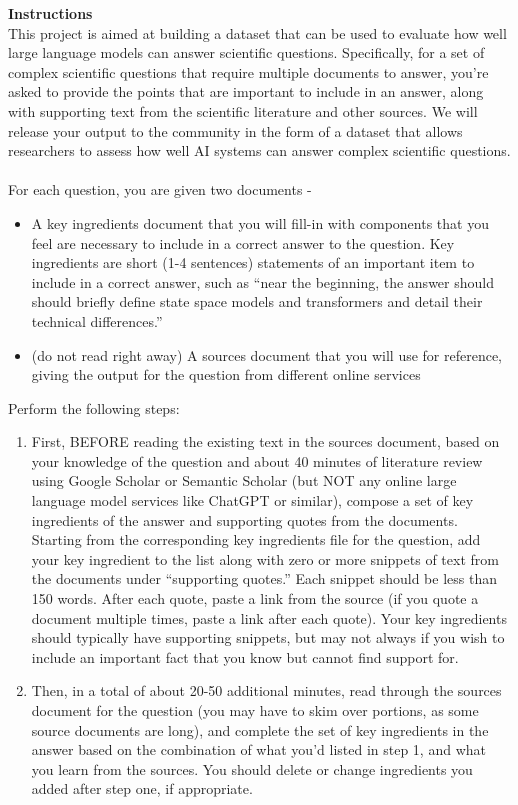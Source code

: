 \begin{table}[h!]
\begin{tcolorbox}
{\bf Instructions}\\ 

This project is aimed at building a dataset that can be used to evaluate how well large language models can answer scientific questions.  Specifically, for a set of complex scientific questions that require multiple documents to answer, you’re asked to provide the points that are important to include in an answer, along with supporting text from the scientific literature and other sources.  We will release your output to the community in the form of a dataset that allows researchers to assess how well AI systems can answer complex scientific questions.
\\
\\
For each question, you are given two documents - 
\begin{itemize}
    \item A key ingredients document that you will fill-in with components that you feel are necessary to include in a correct answer to the question.
Key ingredients are short (1-4 sentences) statements of an important item to include in a correct answer, such as ``near the beginning, the answer should should briefly define state space models and transformers and detail their technical differences.''  
    \item (do not read right away) A sources document that you will use for reference, giving the output for the question from different online services
\end{itemize}
Perform the following steps:

\begin{enumerate}
    \item First, BEFORE reading the existing text in the sources document, based on your knowledge of the question and about 40 minutes of literature review using Google Scholar or Semantic Scholar (but NOT any online large language model services like ChatGPT or similar), compose a set of key ingredients of the answer and supporting quotes from the documents.  Starting from the corresponding key ingredients file for the question, add your key ingredient to the list along with zero or more snippets of text from the documents under ``supporting quotes.''  Each snippet should be less than 150 words.  After each quote, paste a link from the source (if you quote a document multiple times, paste a link after each quote).  Your key ingredients should typically have supporting snippets, but may not always if you wish to include an important fact that you know but cannot find support for.
    \item Then, in a total of about 20-50 additional minutes, read through the sources document  for the question (you may have to skim over portions, as some source documents are long), and complete the set of key ingredients in the answer based on the combination of what you’d listed in step 1, and what you learn from the sources.  You should delete or change ingredients you added after step one, if appropriate.  
    

\end{enumerate}
\end{tcolorbox}
\end{table}
